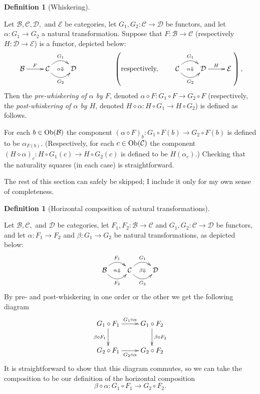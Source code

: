 \documentclass{book}
\def\tn{\textnormal}
\def\mc{\mathcal}
\def\Ob{\tn{Ob}}
\def\hsp{\hspace{.3in}}
\def\to{\rightarrow}
\def\Down{\Downarrow}
\def\taking{\colon}
\def\mcB{\mc{B}}
\def\mcC{\mc{C}}
\def\mcD{\mc{D}}
\def\mcE{\mc{E}}
\theoremstyle{remark}
\theoremstyle{definition}
\newtheorem{definition}[subsubsection]{Definition}
\begin{document}
\begin{definition}[Whiskering]\label{def:whiskering}

Let $\mcB,\mcC,\mcD,$ and $\mcE$ be categories, let $G_1,G_2\taking\mcC\to\mcD$ be functors, and let $\alpha\taking G_1\to G_2$ a natural transformation. Suppose that $F\taking\mcB\to\mcC$ (respectively $H\taking\mcD\to\mcE$) is a functor, depicted below:
$$
\xymatrix{\mcB\ar[r]^F&\mcC\ar@{}[r]|{\alpha\Down}\ar@/^1pc/[r]^{G_1}\ar@/_1pc/[r]_{G_2}&\mcD}
\hspace{.7in}
\left(\tn{respectively,}\hsp\xymatrix{\mcC\ar@{}[r]|{\alpha\Down}\ar@/^1pc/[r]^{G_1}\ar@/_1pc/[r]_{G_2}&\mcD\ar[r]^H&\mcE}\right),
$$
Then the {\em pre-whiskering of $\alpha$ by $F$}, denoted $\alpha\diamond F\taking G_1\circ F\to G_2\circ F$ (respectively, the {\em post-whiskering of $\alpha$ by $H$}, denoted $H\diamond\alpha\taking H\circ G_1\to H\circ G_2$) is defined as follows.

For each $b\in\Ob(\mcB)$ the component $(\alpha\diamond F)_b\taking G_1\circ F(b)\to G_2\circ F(b)$ is defined to be $\alpha_{F(b)}$. (Respectively, for each $c\in\Ob(\mcC)$ the component $(H\diamond\alpha)_c\taking H\circ G_1(c)\to H\circ G_2(c)$ is defined to be $H(\alpha_c)$.) Checking that the naturality squares (in each case) is straightforward.

\end{definition}

The rest of this section can safely be skipped; I include it only for my own sense of completeness.

\begin{definition}[Horizontal composition of natural transformations]\label{def:horizontal comp of nt}

Let $\mcB,\mcC,$ and $\mcD$ be categories, let $F_1,F_2\taking\mcB\to\mcC$ and $G_1,G_2\taking\mcC\to\mcD$ be functors, and let $\alpha\taking F_1\to F_2$ and $\beta\taking G_1\to G_2$ be natural transformations, as depicted below:
$$
\xymatrix{\mcB\ar@{}[r]|{\alpha\Down}\ar@/^1pc/[r]^{F_1}\ar@/_1pc/[r]_{F_2}&\mcC\ar@{}[r]|{\beta\Down}\ar@/^1pc/[r]^{G_1}\ar@/_1pc/[r]_{G_2}&\mcD}
$$
By pre- and post-whiskering in one order or the other we get the following diagram
$$
\xymatrix{
G_1\circ F_1\ar[r]^{G_1\diamond\alpha}\ar[d]_{\beta\diamond F_1}&G_1\circ F_2\ar[d]^{\beta\diamond F_2}\\
G_2\circ F_1\ar[r]_{G_2\diamond\alpha}&G_2\circ F_2}
$$
It is straightforward to show that this diagram commutes, so we can take the composition to be our definition of the horizontal composition 
$$\beta\diamond\alpha\taking G_1\circ F_1\to G_2\circ F_2.$$

\end{definition}
\end{document}
